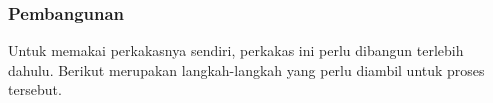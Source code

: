 \begin{comment}
Untuk dapat menjalankan perkakas ini, pengguna harus menginstal sebuah \textit{compiler} bahasa C, vcpkg (untuk Windows), serta dua buah \textit{library} umum yang telah didaftarkan di subbab \ref{sec:testing-specs-software}, yaitu:

\begin{itemize}
	\item cURL, dan
	\item cmake.
\end{itemize}
\noindent
Perlu diperhatikan bahwa \textit{library} cURL perlu diinstal melalui vcpkg, untuk menghindari masalah kompatibilitas akibat versi cURL yang tidak sesuai dengan yang dibutuhkan. Penggunaan vcpkg akan menghindari terjadinya masalah ini karena seluruh \textit{library} di vcpkg selalu diperbarui ke versi terbarunya.

Adapun perkakas ini juga membutuhkan adanya \textit{package} tambahan yang spesifik untuk Linux, yaitu:

\begin{itemize}
	\item libcurl4-openssl-dev (\textit{library development} cURL), dan
	\item GNU Make (opsional).
\end{itemize}

Perkakas ini juga menggunakan \textit{library} cJSON, tetapi untuk alasan kompatibilitas antar Windows dan Linux, \textit{library} ini langsung diikutkan di dalam perkakasnya sendiri, sehingga tidak perlu diinstal oleh pengguna lagi.
\end{comment}

\subsubsection{Pembangunan}
\label{sec:testing-implementation-usage-instalation}

Untuk memakai perkakasnya sendiri, perkakas ini perlu dibangun terlebih dahulu. Berikut merupakan langkah-langkah yang perlu diambil untuk proses tersebut.

